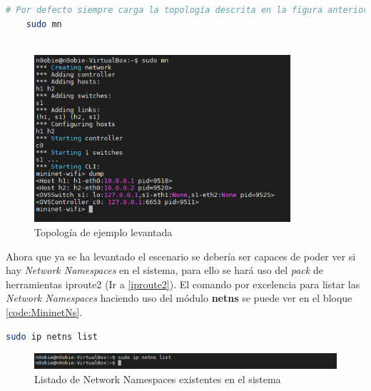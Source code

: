  \begin{lstlisting}[language= bash, style=Consola, caption={Levantamiento de la topología de ejemplo},label=code:scenarioMininet]
    # Por defecto siempre carga la topología descrita en la figura anterior
    sudo mn
    
\end{lstlisting}
\vspace{0.5cm}

\begin{figure}[ht]
    \centering
    \includegraphics[width=9.5cm]{archivos/img/teoria/mn_01.png}
    \caption{Topología de ejemplo levantada}
    \label{fig:mininet_01}
\end{figure}

Ahora que ya se ha levantado el escenario se debería ser capaces de poder ver si hay \textit{Network Namespaces} en el sistema, para ello se hará uso del \textit{pack} de herramientas iproute2 (Ir a \ref{iproute2}). El comando por excelencia para listar las \textit{Network Namespaces} haciendo uso del módulo \textbf{netns} se puede ver en el bloque \ref{code:MininetNs}.


\begin{lstlisting}[language= bash, style=Consola, caption={Listar Network Namespaces},label=code:MininetNs]
    sudo ip netns list
\end{lstlisting}
\vspace{0.5cm}

\begin{figure}[ht]
    \centering
    \includegraphics[width=15.5cm]{archivos/img/teoria/mn_02.png}
    \caption{Listado de Network Namespaces existentes en el sistema}
    \label{fig:mininet_02}
\end{figure}

